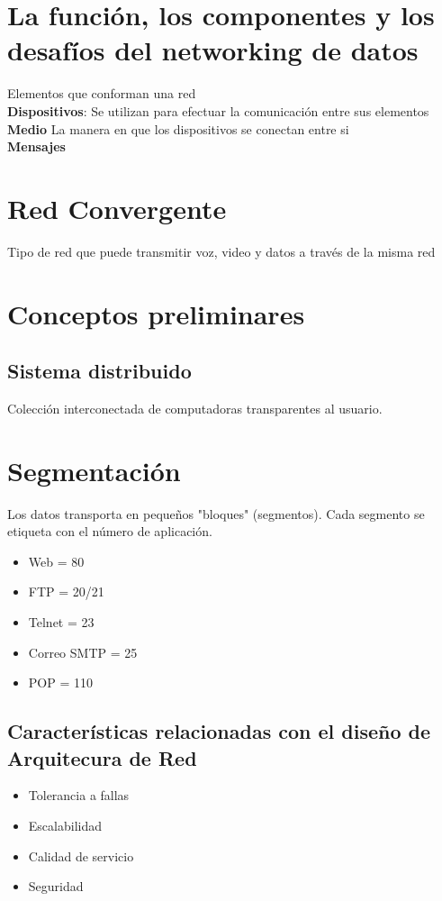 \documentclass[letterpaper,12pt]{article}
\begin{document}
\begin{sloppypar}
\section{La función, los componentes y los desafíos del networking de datos}
Elementos que conforman una red
\vspace{0.3cm}\\ 
\textbf{Dispositivos}: Se utilizan para efectuar la comunicación entre sus elementos 
\vspace{0.3cm}\\ 
\textbf{Medio}
La manera en que los dispositivos se conectan entre si 
\vspace{0.3cm}\\
\textbf{Mensajes} 

\section{Red Convergente}
Tipo de red que puede transmitir voz, video y datos a través de la misma red

\section{Conceptos preliminares}
\subsection{Sistema distribuido}
Colección interconectada de computadoras transparentes al usuario.  

\section{Segmentación}
Los datos transporta en pequeños "bloques" (segmentos). Cada segmento se etiqueta con el número de aplicación.
\begin{itemize}
    \item Web = 80 
    \item FTP = 20/21 
    \item Telnet = 23
    \item Correo SMTP = 25 
    \item POP = 110 
\end{itemize}

\subsection{Características relacionadas con el diseño de Arquitecura de Red }
\begin{itemize}
    \item Tolerancia a fallas 
    \item Escalabilidad 
    \item Calidad de servicio 
    \item Seguridad
\end{itemize}


\end{sloppypar}
\end{document}
